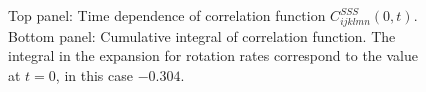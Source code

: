 \documentclass[thesis.tex]{subfiles}
\begin{document}
\begin{figure}
	\begin{center}
\end{center}
\caption{ Top panel: Time dependence of correlation function $C^{SSS}_{ijklmn}(0,t)$. Bottom panel: Cumulative integral of correlation function. The integral in the expansion for rotation rates  correspond to the value at $t=0$, in this case $-0.304$.}%
\end{figure}
\end{document}
